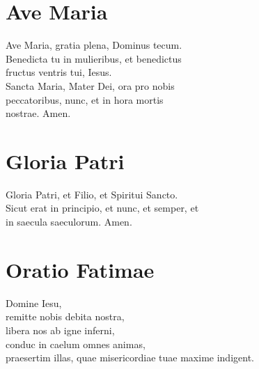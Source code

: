 \documentclass[paper=a5,pagesize=pdftex,fontsize=10pt,headinclude=on,twoside=off]{scrbook}
\begin{document}
\section{Ave Maria}
\begin{scripture}
  \begin{poetry}
    Ave Maria, gratia plena, Dominus tecum.\\
    Benedicta tu in mulieribus, et benedictus\\
    fructus ventris tui, Iesus.\\
    Sancta Maria, Mater Dei, ora pro nobis\\
    peccatoribus, nunc, et in hora mortis\\
    nostrae. Amen.\\
  \end{poetry}
\end{scripture}

\section{Gloria Patri}
\begin{scripture}
  \begin{poetry}
    Gloria Patri, et Filio, et Spiritui Sancto.\\
    Sicut erat in principio, et nunc, et semper, et\\
    in saecula saeculorum. Amen.
  \end{poetry}
\end{scripture}

\section{Oratio Fatimae}
\begin{scripture}
  \begin{poetry}
    Domine Iesu,\\
    remitte nobis debita nostra,\\
    libera nos ab igne inferni,\\
    conduc in caelum omnes animas,\\
    praesertim illas, quae misericordiae tuae maxime indigent.\\
  \end{poetry}
\end{scripture}
\end{document}
